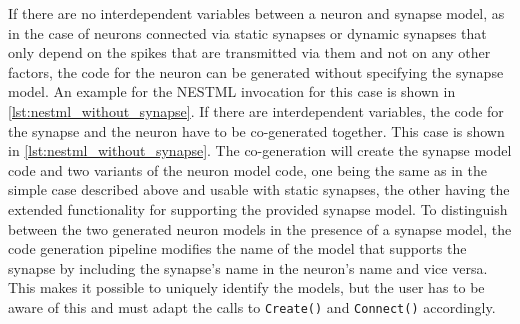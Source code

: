 If there are no interdependent variables between a neuron and synapse model, as in the case of neurons connected via static synapses or dynamic synapses that only depend on the spikes that are transmitted via them and not on any other factors, the code for the neuron can be generated without specifying the synapse model. An example for the NESTML invocation for this case is shown in \autoref{lst:nestml_without_synapse}. If there are interdependent variables, the code for the synapse and the neuron have to be co-generated together. This case is shown in \autoref{lst:nestml_without_synapse}. The co-generation will create the synapse model code and two variants of the neuron model code, one being the same as in the simple case described above and usable with static synapses, the other having the extended functionality for supporting the provided synapse model. To distinguish between the two generated neuron models in the presence of a synapse model, the code generation pipeline modifies the name of the model that supports the synapse by including the synapse's name in the neuron's name and vice versa. This makes it possible to uniquely identify the models, but the user has to be aware of this and must adapt the calls to \texttt{Create()} and \texttt{Connect()} accordingly.

